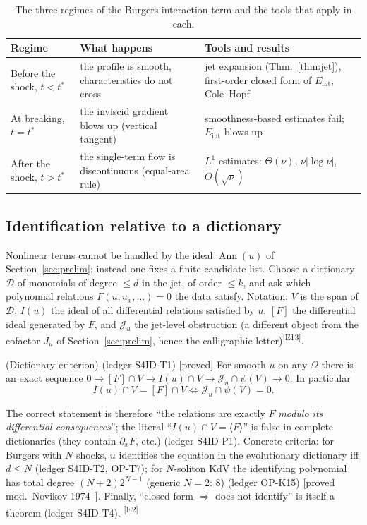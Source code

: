 \documentclass[11pt,a4paper]{article}
\theoremstyle{definition}
\newcommand{\badge}[2]{\textcolor{#1}{\textsf{\footnotesize[#2]}}}
\newcommand{\proved}[1][]{\badge{cC}{proved#1}}
\newcommand{\modulo}[1]{\badge{cD}{proved mod.\ #1}}
\newcommand{\led}[1]{\textcolor{cG}{\textsf{\footnotesize(ledger #1)}}}
\newcommand{\edmark}[1]{\textsuperscript{\textcolor{cB}{\textsf{[#1]}}}}
\newcommand{\Ann}{\operatorname{Ann}}
\newcommand{\Eint}{E_{\mathrm{int}}}
\begin{document}
\begin{table}[!htb]
\centering\small
\begin{tabular}{@{}L{3.0cm}L{4.9cm}L{6.2cm}@{}}
\toprule
Regime & What happens & Tools and results\\\midrule
Before the shock, $t<t^*$ & the profile is smooth, characteristics do not cross & jet expansion (Thm.~\ref{thm:jet}), first-order closed form of $\Eint$, Cole--Hopf\\
At breaking, $t=t^*$ & the inviscid gradient blows up (vertical tangent) & smoothness-based estimates fail; $\Eint$ blows up\\
After the shock, $t>t^*$ & the single-term flow is discontinuous (equal-area rule) & $L^1$ estimates: $\Theta(\nu)$, $\nu|\log\nu|$, $\Theta(\sqrt\nu)$\\
\bottomrule
\end{tabular}
\caption{The three regimes of the Burgers interaction term and the tools that apply in each.}\label{tab:regimes}
\end{table}

\subsection{Identification relative to a dictionary}
Nonlinear terms cannot be handled by the ideal $\Ann(u)$ of Section~\ref{sec:prelim}; instead one fixes a finite candidate list. Choose a dictionary $\mathcal D$ of monomials of degree $\le d$ in the jet, of order $\le k$, and ask which polynomial relations $F(u,u_x,\dots)=0$ the data satisfy. Notation: $V$ is the span of $\mathcal D$, $I(u)$ the ideal of all differential relations satisfied by $u$, $[F]$ the differential ideal generated by $F$, and $\mathcal J_u$ the jet-level obstruction (a different object from the cofactor $J_u$ of Section~\ref{sec:prelim}, hence the calligraphic letter)\edmark{E13}.
\begin{theorem}{(Dictionary criterion) \led{S4ID-T1} \proved[]}\label{thm:dict}
For smooth $u$ on any $\Omega$ there is an exact sequence $0\to[F]\cap V\to I(u)\cap V\to\mathcal J_u\cap\psi(V)\to0$. In particular
\[
I(u)\cap V=[F]\cap V\iff\mathcal J_u\cap\psi(V)=0 .
\]
\end{theorem}
The correct statement is therefore ``the relations are exactly $F$ \emph{modulo its differential consequences}''; the literal ``$I(u)\cap V=\langle F\rangle$'' is false in complete dictionaries (they contain $\partial_xF$, etc.) \led{S4ID-P1}. Concrete criteria: for Burgers with $N$ shocks, $u$ identifies the equation in the evolutionary dictionary iff $d\le N$ \led{S4ID-T2, OP-T7}; for $N$-soliton KdV the identifying polynomial has total degree $(N+2)2^{N-1}$ (generic $N=2$: $8$) \led{OP-K15} \modulo{Novikov 1974~\cite{no}}. Finally, ``closed form $\Rightarrow$ does not identify'' is itself a theorem \led{S4ID-T4}.
\edmark{E2}
\end{document}
